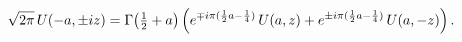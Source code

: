 \[\sqrt{2\pi}\mathop{U\/}\nolimits\!\left(-a,\pm iz\right)=\mathop{\Gamma\/}%
\nolimits\!\left(\tfrac{1}{2}+a\right)\left(e^{\mp i\pi(\frac{1}{2}a-\frac{1}{%
4})}\mathop{U\/}\nolimits\!\left(a,z\right)+e^{\pm i\pi(\frac{1}{2}a-\frac{1}{%
4})}\mathop{U\/}\nolimits\!\left(a,-z\right)\right).\]